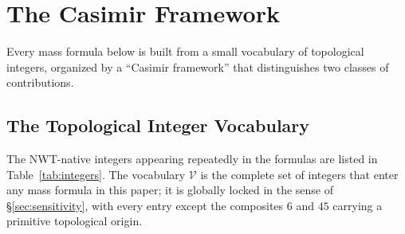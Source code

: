 \documentclass[11pt]{article}
\begin{document}
\section{The Casimir Framework}
\label{sec:casimir}

Every mass formula below is built from a small vocabulary of
topological integers, organized by a ``Casimir framework'' that
distinguishes two classes of contributions.

\subsection{The Topological Integer Vocabulary}

The NWT-native integers appearing repeatedly in the formulas are
listed in Table~\ref{tab:integers}.  The vocabulary $\mathcal{V}$
is the complete set of integers that enter any mass formula in this
paper; it is globally locked in the sense of
\S\ref{sec:sensitivity}, with every entry except the composites
$6$ and $45$ carrying a primitive topological origin.
\end{document}
